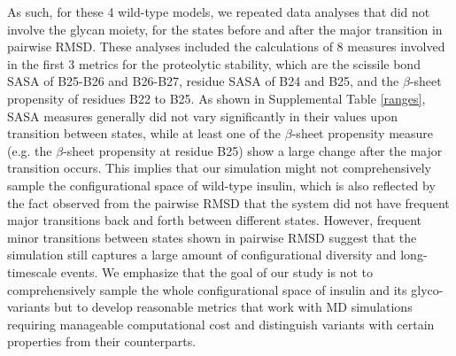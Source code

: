 \documentclass[9pt]{elife}
\begin{document}
As such, for these 4 wild-type models, we repeated data analyses that did not involve the glycan moiety, for the states before and after the major transition in pairwise RMSD. These analyses included the calculations of 8 measures involved in the first 3 metrics for the proteolytic stability, which are the scissile bond SASA of B25-B26 and B26-B27, residue SASA of B24 and B25, and the $\beta$-sheet propensity of residues B22 to B25. As shown in Supplemental Table \ref{ranges}, SASA measures generally did not vary significantly in their values upon transition between states, while at least one of the $\beta$-sheet propensity measure (e.g. the $\beta$-sheet propensity at residue B25) show a large change after the major transition occurs. This implies that our simulation might not comprehensively sample the configurational space of wild-type insulin, which is also reflected by the fact observed from the pairwise RMSD that the system did not have frequent major transitions back and forth between different states. However, frequent minor transitions between states shown in pairwise RMSD suggest that the simulation still captures a large amount of configurational diversity and long-timescale events. We emphasize that the goal of our study is not to comprehensively sample the whole configurational space of insulin and its glyco-variants but to develop reasonable metrics that work with MD simulations requiring manageable computational cost and distinguish variants with certain properties from their counterparts.  
\end{document}

